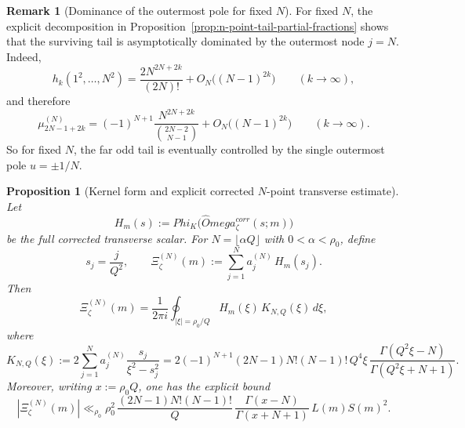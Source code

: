 \documentclass[11pt,a4paper]{amsart}
\def\Omega{Omega}%
\def\Phi{Phi}%
\def\corr{corr}%
\theoremstyle{plain}
\newtheorem{proposition}[theorem]{Proposition}
\theoremstyle{definition}
\newtheorem{remark}[theorem]{Remark}
\newcommand{\corr}{\mathrm{corr}}
\begin{document}
\begin{remark}[Dominance of the outermost pole for fixed $N$]
\label{rem:n-point-tail-dominant-outer-pole}
For fixed $N$, the explicit decomposition in
Proposition~\ref{prop:n-point-tail-partial-fractions} shows that the surviving
tail is asymptotically dominated by the outermost node $j=N$. Indeed,
\[
h_k(1^2,\dots,N^2)
=
\frac{2N^{2N+2k}}{(2N)!}
+
O_N\!\bigl((N-1)^{2k}\bigr)
\qquad (k\to\infty),
\]
and therefore
\[
\mu_{2N-1+2k}^{(N)}
=
(-1)^{N+1}\frac{N^{2N+2k}}{\binom{2N-2}{N-1}}
+
O_N\!\bigl((N-1)^{2k}\bigr)
\qquad (k\to\infty).
\]
So for fixed $N$, the far odd tail is eventually controlled by the single
outermost pole $u=\pm 1/N$.
\end{remark}

\begin{proposition}[Kernel form and explicit corrected $N$-point transverse estimate]
\label{prop:corrected-n-point}
Let
\[
H_m(s):=\Phi_K\!\bigl(\widehat\Omega_\zeta^{\corr}(s;m)\bigr)
\]
be the full corrected transverse scalar.
For $N=\lfloor \alpha Q\rfloor$ with $0<\alpha<\rho_0$, define
\[
s_j=\frac{j}{Q^2},
\qquad
\Xi_\zeta^{(N)}(m)
:=
\sum_{j=1}^N a_j^{(N)}\,H_m(s_j).
\]
Then
\[
\Xi_\zeta^{(N)}(m)
=
\frac{1}{2\pi i}
\oint_{|\xi|=\rho_0/Q}
H_m(\xi)\,K_{N,Q}(\xi)\,d\xi,
\]
where
\[
K_{N,Q}(\xi)
:=
2\sum_{j=1}^N a_j^{(N)}\frac{s_j}{\xi^2-s_j^2}
=
2(-1)^{N+1}(2N-1)N!(N-1)! \, Q^4\xi\,
\frac{\Gamma(Q^2\xi-N)}{\Gamma(Q^2\xi+N+1)}.
\]
Moreover, writing $x:=\rho_0Q$, one has the explicit bound
\[
|\Xi_\zeta^{(N)}(m)|
\ll_{\rho_0}
\rho_0^2\,
\frac{(2N-1)N!(N-1)!}{Q}\,
\frac{\Gamma(x-N)}{\Gamma(x+N+1)}\,
L(m)S(m)^2.
\]
\end{proposition}
\end{document}
